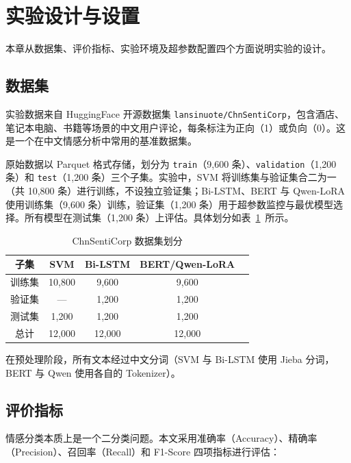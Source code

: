 \section{实验设计与设置}
\label{sec:experiment}

本章从数据集、评价指标、实验环境及超参数配置四个方面说明实验的设计。

\subsection{数据集}
\label{sec:dataset}

实验数据来自 HuggingFace 开源数据集 \texttt{lansinuote/ChnSentiCorp}，包含酒店、笔记本电脑、书籍等场景的中文用户评论，每条标注为正向（1）或负向（0）。这是一个在中文情感分析中常用的基准数据集。

原始数据以 Parquet 格式存储，划分为 \texttt{train}（9,600 条）、\texttt{validation}（1,200 条）和 \texttt{test}（1,200 条）三个子集。实验中，SVM 将训练集与验证集合二为一（共 10,800 条）进行训练，不设独立验证集；Bi-LSTM、BERT 与 Qwen-LoRA 使用训练集（9,600 条）训练，验证集（1,200 条）用于超参数监控与最优模型选择。所有模型在测试集（1,200 条）上评估。具体划分如表~\ref{tab:dataset}~所示。

\begin{table}[htbp]
    \centering
    \caption{ChnSentiCorp 数据集划分}
    \label{tab:dataset}
    \begin{tabular}{ccccc}
        \toprule
        子集 & SVM & Bi-LSTM & BERT/Qwen-LoRA \\
        \midrule
        训练集 & 10,800 & 9,600 & 9,600\\
        验证集 & ---    & 1,200 & 1,200\\
        测试集 & 1,200  & 1,200 & 1,200\\
        \midrule
        总计   & 12,000 & 12,000 & 12,000\\
        \bottomrule
    \end{tabular}
\end{table}

在预处理阶段，所有文本经过中文分词（SVM 与 Bi-LSTM 使用 Jieba 分词，BERT 与 Qwen 使用各自的 Tokenizer）。

\subsection{评价指标}
\label{sec:metrics}

情感分类本质上是一个二分类问题。本文采用准确率（Accuracy）、精确率（Precision）、召回率（Recall）和 F1-Score 四项指标进行评估：

